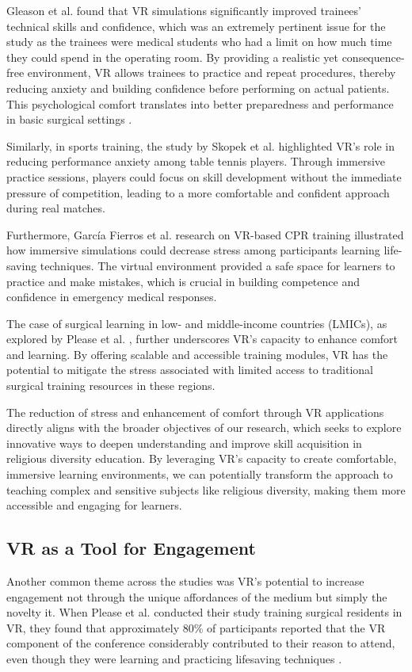 \documentclass[conference]{IEEEtran}
\begin{document}
Gleason et al. found that VR simulations significantly improved trainees' technical skills and confidence, which was an extremely pertinent issue for the study as the trainees were medical students who had a limit on how much time they could spend in the operating room. By providing a realistic yet consequence-free environment, VR allows trainees to practice and repeat procedures, thereby reducing anxiety and building confidence before performing on actual patients. This psychological comfort translates into better preparedness and performance in basic surgical settings \cite{gleason_developing_2022} \cite{zaki_virtual_2023} \cite{buchori_virtual_2023}.

Similarly, in sports training, the study by Skopek et al. \cite{skopek_use_2023} highlighted VR's role in reducing performance anxiety among table tennis players. Through immersive practice sessions, players could focus on skill development without the immediate pressure of competition, leading to a more comfortable and confident approach during real matches.

Furthermore, García Fierros et al. \cite{garcia_fierros_virtualcpr_2021} research on VR-based CPR training illustrated how immersive simulations could decrease stress among participants learning life-saving techniques. The virtual environment provided a safe space for learners to practice and make mistakes, which is crucial in building competence and confidence in emergency medical responses.

The case of surgical learning in low- and middle-income countries (LMICs), as explored by Please et al. \cite{please_virtual_2024}, further underscores VR's capacity to enhance comfort and learning. By offering scalable and accessible training modules, VR has the potential to mitigate the stress associated with limited access to traditional surgical training resources in these regions.

The reduction of stress and enhancement of comfort through VR applications directly aligns with the broader objectives of our research, which seeks to explore innovative ways to deepen understanding and improve skill acquisition in religious diversity education. By leveraging VR's capacity to create comfortable, immersive learning environments, we can potentially transform the approach to teaching complex and sensitive subjects like religious diversity, making them more accessible and engaging for learners.

\subsection{VR as a Tool for Engagement}
Another common theme across the studies was VR's potential to increase engagement not through the unique affordances of the medium but simply the novelty it. When Please et al. \cite{please_virtual_2024} conducted their study training surgical residents in VR, they found that approximately 80\% of participants reported that the VR component of the conference considerably contributed to their reason to attend, even though they were learning and practicing lifesaving techniques \cite{please_virtual_2024}.
\end{document}
